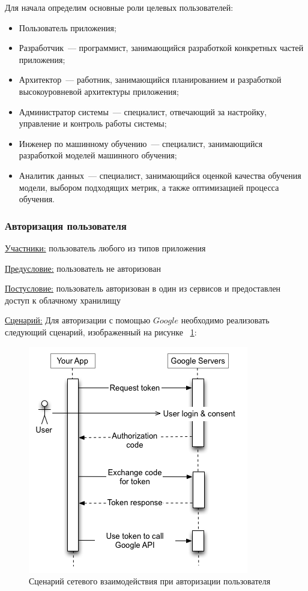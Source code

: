 Для начала определим основные роли целевых пользователей:
\begin{itemize}
    \item Пользователь приложения;
    \item Разработчик~--- программист, занимающийся разработкой конкретных частей приложения;
    \item Архитектор~--- работник, занимающийся планированием и разработкой высокоуровневой архитектуры приложения;
    \item Администратор системы~--- специалист, отвечающий за настройку, управление и контроль работы системы;
    \item Инженер по машинному обучению~--- специалист, занимающийся разработкой моделей машинного обучения;
    \item Аналитик данных~--- специалист, занимающийся оценкой качества обучения модели, выбором подходящих метрик, а также оптимизацией процесса обучения.
\end{itemize}

\subsubsection{Авторизация пользователя}
\underline{Участники:} пользователь любого из типов приложения

\underline{Предусловие:} пользователь не авторизован

\underline{Постусловие:} пользователь авторизован в один из сервисов и предоставлен доступ к облачному хранилищу

\underline{Сценарий:}
Для авторизации с помощью $Google$ необходимо реализовать следующий сценарий, изображенный на рисунке ~\ref{auth}:

\begin{figure}
    \includegraphics[scale=0.5]{img/use_cases/authorization.png}
    \caption{Сценарий сетевого взаимодействия при авторизации пользователя \cite{OAuth_google}}
    \label{auth}
\end{figure}

